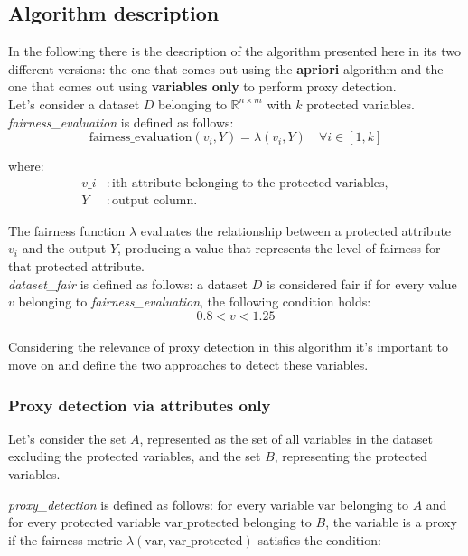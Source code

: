 \documentclass[12pt,a4paper,openright,twoside]{book}
\begin{document}
\subsection{Algorithm description}
In the following there is the description of the algorithm presented here in its two different versions: the one that comes out using the \textbf{apriori} algorithm and the one that comes out using \textbf{variables only} to perform proxy detection. \\

Let's consider a dataset \( D \) belonging to \( \mathbb{R}^{n \times m} \) with \( k \) protected variables. \\

\textit{fairness\_evaluation} is defined as follows:
\[
\text{fairness\_evaluation}(v_i, Y) = \lambda(v_i, Y) \quad \forall i \in [1, k]
\]

where:
\begin{align*}
v\_i & : \text{ith attribute belonging to the protected variables}, \\
Y & : \text{output column}.
\end{align*}

The fairness function \( \lambda \) evaluates the relationship between a protected attribute \( v_i \) and the output \( Y \), producing a value that represents the level of fairness for that protected attribute. \\

\textit{dataset\_fair} is defined as follows: a dataset \( D \) is considered fair if for every value \( v \) belonging to \textit{fairness\_evaluation}, the following condition holds:
\[ 0.8  < v < 1.25 \] \\

Considering the relevance of proxy detection in this algorithm it's important to move on and define the two approaches to detect these variables. \\

\subsubsection{Proxy detection via attributes only}
Let's consider the set \( A \), represented as the set of all variables in the dataset excluding the protected variables, and the set \( B \), representing the protected variables.

\textit{proxy\_detection} is defined as follows: for every variable \( \text{var} \) belonging to \( A \) and for every protected variable \( \text{var\_protected} \) belonging to \( B \), the variable is a proxy if the fairness metric \( \lambda(\text{var}, \text{var\_protected}) \) satisfies the condition:
\end{document}
